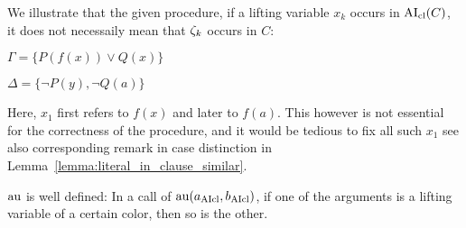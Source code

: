 \documentclass[,%
	paper=a4,%
	DIV12, %
	twoside=false,%
	liststotoc,
	bibtotoc,
	draft=false,%
	numbers=noendperiod
]{scrartcl}
\begin{document}
\begin{exa} 
	\label{exa:lifting_var_refers_to_different_term}
	We illustrate that the given procedure, if a lifting variable $x_k$ occurs in $\operatorname{AI}_\mathrm{cl}(C)$, it does not necessaily mean that $\zeta_{k}$ occurs in $C$:

	$\Gamma = \{P(f(x))\lor Q(x)\}$

	$\Delta = \{\lnot P(y), \lnot Q(a)\}$
	\begin{prooftree}



	\end{prooftree}
	Here, $x_1$ first refers to $f(x)$ and later to $f(a)$.
	This however is not essential for the correctness of the procedure, and it would be tedious to fix all such $x_1$ see also corresponding remark in case distinction in Lemma~\ref{lemma:literal_in_clause_similar}.
\end{exa} 

			\begin{conj}
				$\operatorname{au}$ is well defined:
				In a call of $\operatorname{au}(a_{\operatorname{AIcl}}, b_{\operatorname{AIcl}})$, if one of the arguments is a lifting variable of a certain color, then so is the other.
			\end{conj}
\end{document}
